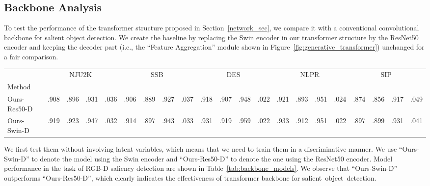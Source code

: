 \documentclass{article}
\begin{document}
\subsection{Backbone Analysis}
\label{sec:backbone_analysis}
To test the performance of the transformer structure proposed in Section~\ref{network_sec}, we compare it with a conventional convolutional backbone for salient object detection. We create the baseline by replacing the Swin encoder in our transformer structure by the ResNet50~\cite{he2016deep_resnet} encoder and keeping the decoder part (i.e., the ``Feature Aggregation'' module shown in Figure~\ref{fig:generative_transformer}) unchanged for a fair comparison. 

\begin{table*}[b!]
\vspace{-0.15in}
\centering
\scriptsize
  \renewcommand{\arraystretch}{1.2}
  \renewcommand{\tabcolsep}{0.35mm}
  \caption{Analysis of different backbones without involving latent variables.}
{
\begin{tabular}{l|cccc|cccc|cccc|cccc|cccc}
  \hline
&\multicolumn{4}{c|}{NJU2K~\cite{NJU2000}}&\multicolumn{4}{c|}{SSB~\cite{niu2012leveraging}}&\multicolumn{4}{c|}{DES~\cite{cheng2014depth}}&\multicolumn{4}{c|}{NLPR~\cite{peng2014rgbd}}&\multicolumn{4}{c}{SIP~\cite{sip_dataset}} \\
    Method & &&&& &&&& &&&& &&&& &&&\\ \hline


Ours-Res50-D &.908 &.896 &.931 &.036 &.906 &.889 &.927 &.037 &.918 &.907 &.948 &.022 &.921 &.893 &.951 &.024  &.874 &.856 &.917 &.049   \\  
  Ours-Swin-D &.919 &.923 &.947 &.032 &.914 &.897 &.943 &.033 &.931 &.919 &.959 &.022 &.933 &.912 &.951 &.022  &.897 &.899 &.931 &.041  \\  
  \hline
\end{tabular}
}
\label{tab:backbone_models}
\end{table*}

We first test them without involving latent variables, which means that we need to train them in a discriminative manner.  We use ``Ours-Swin-D'' to denote the model using the Swin encoder and ``Ours-Res50-D'' to denote the one using the ResNet50 encoder.
Model performance in the task of RGB-D saliency detection are shown in Table~\ref{tab:backbone_models}.  We observe that ``Ours-Swin-D'' outperforms ``Ours-Res50-D'', which clearly indicates the effectiveness of  transformer backbone for salient~object~detection. 
\end{document}
